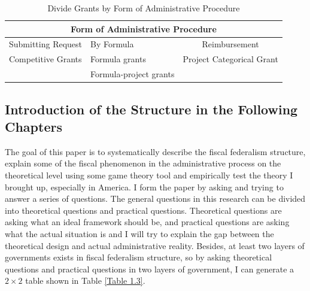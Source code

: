 \begin{table}[htbp]
    \centering
    \caption{Divide Grants by Form of Administrative Procedure}
      \begin{tabular}{clc}
      \toprule
      \multicolumn{3}{c}{Form of Administrative Procedure} \\
      \midrule
      \multicolumn{1}{p{9.645em}}{ Submitting Request} & \multicolumn{1}{p{10.285em}}{               By Formula} & \multicolumn{1}{p{10.855em}}{Reimbursement} \\
      \midrule
      \multicolumn{1}{l}{Competitive Grants} & Formula grants & Project Categorical Grant \\
            & Formula-project grants &  \\
      \bottomrule
      \end{tabular}%
    \label{Table 1.2}%
  \end{table}%
  
  
  


\subsection{Introduction of the Structure in the Following Chapters}
The goal of this paper is to systematically describe the fiscal federalism structure, explain some of the fiscal phenomenon in the administrative process on the theoretical level using some game theory tool and empirically test the theory I brought up, especially in America. I form the paper by asking and trying to answer a series of questions. The general questions in this research can be divided into theoretical questions and practical questions. Theoretical questions are asking what an ideal framework should be, and practical questions are asking what the actual situation is and I will try to explain the gap between the theoretical design and actual administrative reality. Besides, at least two layers of governments exists in fiscal federalism structure, so by asking theoretical questions and practical questions in two layers of government, I can generate a $2\times2$ table shown in Table \ref*{Table 1.3}.

